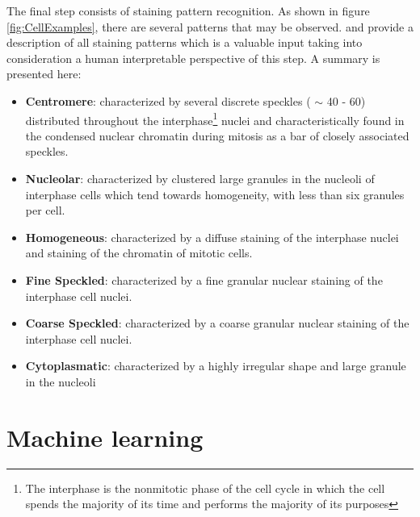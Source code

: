 The final step consists of staining pattern recognition. As shown in figure \ref{fig:CellExamples}, there are several patterns that may be observed. \cite{FoggiaBenchmarks2013} and \cite{Perner02miningknowledge} provide a description of all staining patterns which is a valuable input taking into consideration a human interpretable perspective of this step. A summary is presented here:
\begin{itemize}

	\item \textbf{Centromere}: characterized by several discrete speckles ( $\sim$ 40 - 60) distributed throughout the interphase\footnote{The interphase is the nonmitotic phase of the cell cycle in which the cell spends the majority of its time and performs the majority of its purposes} nuclei and characteristically found in the condensed nuclear chromatin during mitosis as a bar of closely associated speckles.
	
	\item \textbf{Nucleolar}: characterized by clustered large granules in
the nucleoli of interphase cells which tend towards homogeneity, with less than six granules per cell.

	\item \textbf{Homogeneous}: characterized by a diffuse staining of the interphase nuclei and staining of the chromatin of mitotic cells.
	
	\item \textbf{Fine Speckled}: characterized by a fine granular nuclear staining of the interphase cell nuclei.
	
	\item \textbf{Coarse Speckled}: characterized by a coarse granular nuclear staining of the interphase cell nuclei.
	
	\item \textbf{Cytoplasmatic}: characterized by a highly irregular shape and large granule in the nucleoli

\end{itemize}



\section{Machine learning}

